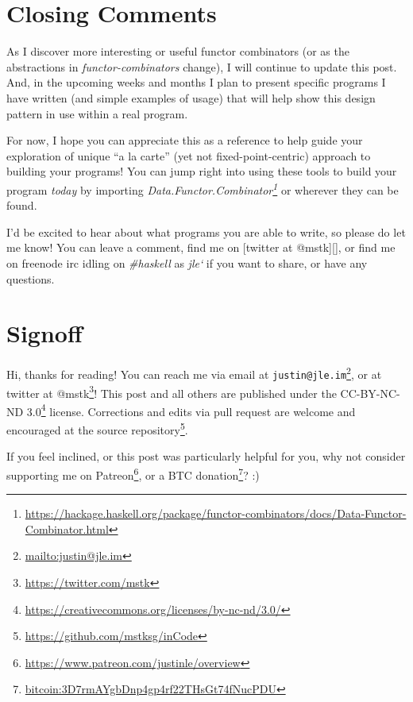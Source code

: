\documentclass[]{article}
\renewcommand{\href}[2]{#2\footnote{\url{#1}}}
\begin{document}
\hypertarget{closing-comments}{%
\section{Closing Comments}\label{closing-comments}}

As I discover more interesting or useful functor combinators (or as the
abstractions in \emph{functor-combinators} change), I will continue to update
this post. And, in the upcoming weeks and months I plan to present specific
programs I have written (and simple examples of usage) that will help show this
design pattern in use within a real program.

For now, I hope you can appreciate this as a reference to help guide your
exploration of unique ``a la carte'' (yet not fixed-point-centric) approach to
building your programs! You can jump right into using these tools to build your
program \emph{today} by importing
\emph{\href{https://hackage.haskell.org/package/functor-combinators/docs/Data-Functor-Combinator.html}{Data.Functor.Combinator}}
or wherever they can be found.

I'd be excited to hear about what programs you are able to write, so please do
let me know! You can leave a comment, find me on {[}twitter at @mstk{]}{[}{]},
or find me on freenode irc idling on \emph{\#haskell} as \emph{jle`} if you want
to share, or have any questions.

\hypertarget{signoff}{%
\section{Signoff}\label{signoff}}

Hi, thanks for reading! You can reach me via email at
\href{mailto:justin@jle.im}{\nolinkurl{justin@jle.im}}, or at twitter at
\href{https://twitter.com/mstk}{@mstk}! This post and all others are published
under the \href{https://creativecommons.org/licenses/by-nc-nd/3.0/}{CC-BY-NC-ND
3.0} license. Corrections and edits via pull request are welcome and encouraged
at \href{https://github.com/mstksg/inCode}{the source repository}.

If you feel inclined, or this post was particularly helpful for you, why not
consider \href{https://www.patreon.com/justinle/overview}{supporting me on
Patreon}, or a \href{bitcoin:3D7rmAYgbDnp4gp4rf22THsGt74fNucPDU}{BTC donation}?
:)
\end{document}
